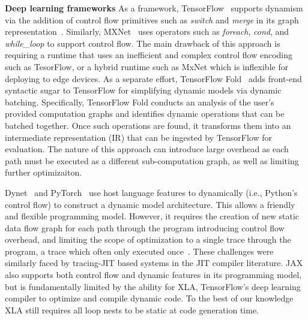 \noindent
{\bf Deep learning frameworks} As a framework, TensorFlow~\citep{tensorflow} supports dynamism via the addition of control flow primitives such as \emph{switch} and \emph{merge} in its graph representation~\citep{yu2018dynamic}. Similarly, MXNet~\citep{mxnet, mxnet-control} uses operators such as {\em foreach}, {\em cond}, and {\em while\_loop} to support control flow. The main drawback of this approach is requiring a runtime that uses an inefficient and complex control flow encoding such as TesorFlow, or a hybrid runtime such as MxNet which is inflexible for deploying to edge devices. As a separate effort, TensorFlow Fold~\citep{tensorflowfold} adds front-end syntactic sugar to TensorFlow for simplifying dynamic models via dynamic batching. Specifically, TensorFlow Fold conducts an analysis of the user's provided computation graphs and identifies dynamic operations that can be batched together. Once such operations are found, it transforms them into an intermediate representation (IR) that can be ingested by TensorFlow for evaluation. The nature of this approach can introduce large overhead as each path must be executed as a different sub-computation graph, as well as limiting further optimizaiton.

Dynet~\citep{neubig2017dynet} and PyTorch~\citep{pytorch} use host language features to dynamically (i.e., Python's control flow) to construct a dynamic model architecture. This allows a friendly and flexible programming model.
However, it requires the creation of new static data flow graph for each path through the program introducing control flow overhead, and limiting the scope of optimization to a single trace through the program, a trace which often only executed once~\citep{xu2018cavs}. These challenges were similarly faced by tracing-JIT based systems in the JIT compiler literature. JAX~\citep{jax2018github} also supports both control flow and dynamic features in its programming model, but is fundamentally limited by the ability for XLA, TensorFlow's deep learning compiler to optimize and compile dynamic code. To the best of our knowledge XLA still requires all loop nests to be static at code generation time.

